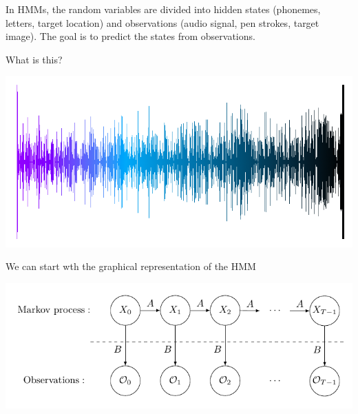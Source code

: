 \documentclass[c]{beamer}
\begin{document}
\begin{frame}
  In HMMs, the random variables are divided into hidden states (phonemes, letters, target location) and observations (audio signal, pen strokes, target image). The goal is to predict the states from observations.

  What is this?
\begin{center}
  \includegraphics[width=0.7\linewidth]{../figures/SultansofSwing.png}
\end{center}
\end{frame}

\begin{frame}
We can start wth the graphical representation of the HMM
\begin{center}
 \includegraphics[width=0.7\linewidth]{../figures/HMM.pdf}
\end{center}
\end{frame}

\end{document}
